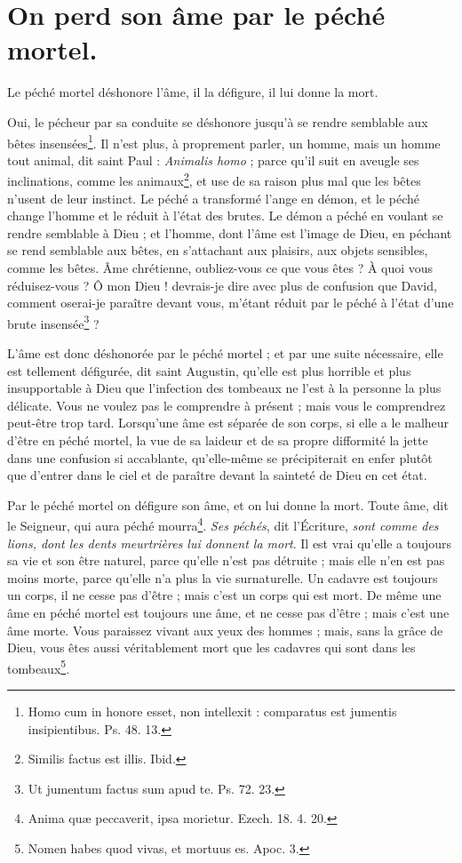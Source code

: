 \documentclass[instructions.tex]{subfiles}
\begin{document}
\chapter{On perd son âme par le péché mortel.}


Le péché mortel déshonore l’âme, il la défigure, il lui donne la mort.


\primo Oui, le pécheur par sa conduite se déshonore jusqu’à se rendre semblable aux bêtes insensées\footnote{Homo cum in honore esset, non intellexit : comparatus est jumentis insipientibus. Ps. 48. 13.}. Il n’est plus, à proprement parler, un homme, mais un homme tout animal, dit saint Paul : \textit{Animalis homo} ; parce qu’il suit en aveugle ses inclinations, comme les animaux\footnote{Similis factus est illis. Ibid.}, et use de sa raison plus mal que les bêtes n’usent de leur instinct. Le péché a transformé l’ange en démon, et le péché change l’homme et le réduit à l’état des brutes. Le démon a péché en voulant se rendre semblable à Dieu ; et l’homme, dont l’âme est l’image de Dieu, en péchant se rend semblable aux bêtes, en s’attachant aux plaisirs, aux objets sensibles, comme les bêtes. Âme chrétienne, oubliez-vous ce que vous êtes ? À quoi vous réduisez-vous ? Ô mon Dieu ! devrais-je dire avec plus de confusion que David, comment oserai-je paraître devant vous, m’étant réduit par le péché à l’état d’une brute insensée\footnote{Ut jumentum factus sum apud te. Ps. 72. 23.} ?


\secundo L’âme est donc déshonorée par le péché mortel ; et par une suite nécessaire, elle est tellement défigurée, dit saint Augustin, qu’elle est plus horrible et plus insupportable à Dieu que l’infection des tombeaux ne l’est à la personne la plus délicate. Vous ne voulez pas le comprendre à présent ; mais vous le comprendrez peut-être trop tard. Lorsqu’une âme est séparée de son corps, si elle a le malheur d’être en péché mortel, la vue de sa laideur et de sa propre difformité la jette dans une confusion si accablante, qu’elle-même se précipiterait en enfer plutôt que d’entrer dans le ciel et de paraître devant la sainteté de Dieu en cet état.


\tertio Par le péché mortel on défigure son âme, et on lui donne la mort. Toute âme, dit le Seigneur, qui aura péché mourra\footnote{Anima quæ peccaverit, ipsa morietur. Ezech. 18. 4. 20.}. \textit{Ses péchés}, dit l’Écriture, \textit{sont comme des lions, dont les dents meurtrières lui donnent la mort}. Il est vrai qu’elle a toujours sa vie et son être naturel, parce qu’elle n’est pas détruite ; mais elle n’en est pas moins morte, parce qu’elle n’a plus la vie surnaturelle. Un cadavre est toujours un corps, il ne cesse pas d’être ; mais c’est un corps qui est mort. De même une âme en péché mortel est toujours une âme, et ne cesse pas d’être ; mais c’est une âme morte. Vous paraissez vivant aux yeux des hommes ; mais, sans la grâce de Dieu, vous êtes aussi véritablement mort que les cadavres qui sont dans les tombeaux\footnote{Nomen habes quod vivas, et mortuus es. Apoc. 3.}.
\end{document}
